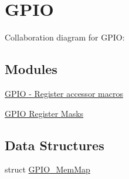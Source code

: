 \hypertarget{group___g_p_i_o___peripheral}{}\section{G\+P\+IO}
\label{group___g_p_i_o___peripheral}
Collaboration diagram for G\+P\+IO\+:
\subsection*{Modules}
\begin{DoxyCompactItemize}
\item 
\hyperlink{group___g_p_i_o___register___accessor___macros}{G\+P\+I\+O -\/ Register accessor macros}
\item 
\hyperlink{group___g_p_i_o___register___masks}{G\+P\+I\+O Register Masks}
\end{DoxyCompactItemize}
\subsection*{Data Structures}
\begin{DoxyCompactItemize}
\item 
struct \hyperlink{struct_g_p_i_o___mem_map}{G\+P\+I\+O\+\_\+\+Mem\+Map}
\end{DoxyCompactItemize}
